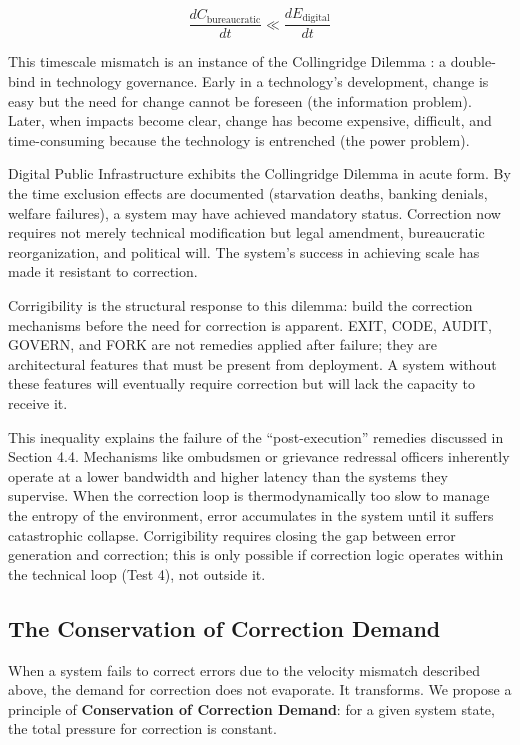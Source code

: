 \begin{equation}
\frac{dC_{\text{bureaucratic}}}{dt} \ll \frac{dE_{\text{digital}}}{dt}
\end{equation}

This timescale mismatch is an instance of the Collingridge Dilemma \citep{collingridge1980}: a double-bind in technology governance. Early in a technology's development, change is easy but the need for change cannot be foreseen (the information problem). Later, when impacts become clear, change has become expensive, difficult, and time-consuming because the technology is entrenched (the power problem).

Digital Public Infrastructure exhibits the Collingridge Dilemma in acute form. By the time exclusion effects are documented (starvation deaths, banking denials, welfare failures), a system may have achieved mandatory status. Correction now requires not merely technical modification but legal amendment, bureaucratic reorganization, and political will. The system's success in achieving scale has made it resistant to correction.

Corrigibility is the structural response to this dilemma: build the correction mechanisms before the need for correction is apparent. EXIT, CODE, AUDIT, GOVERN, and FORK are not remedies applied after failure; they are architectural features that must be present from deployment. A system without these features will eventually require correction but will lack the capacity to receive it.

This inequality explains the failure of the ``post-execution'' remedies discussed in Section 4.4. Mechanisms like ombudsmen or grievance redressal officers inherently operate at a lower bandwidth and higher latency than the systems they supervise. When the correction loop is thermodynamically too slow to manage the entropy of the environment, error accumulates in the system until it suffers catastrophic collapse. Corrigibility requires closing the gap between error generation and correction; this is only possible if correction logic operates within the technical loop (Test 4), not outside it.

\subsection{The Conservation of Correction Demand}

When a system fails to correct errors due to the velocity mismatch described above, the demand for correction does not evaporate. It transforms. We propose a principle of \textbf{Conservation of Correction Demand}: for a given system state, the total pressure for correction is constant.

